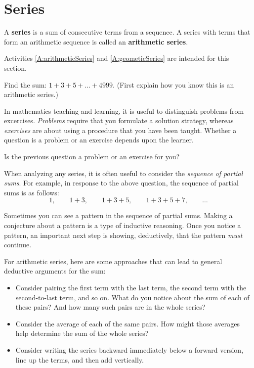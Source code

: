 \newpage

\section{Series}  
\begin{definition}
A \textbf{series} is a sum of consecutive terms from a sequence.  A series with terms that form an arithmetic sequence is called an \textbf{arithmetic series}.  
\end{definition}

\begin{activitynote}
Activities \ref{A:arithmeticSeries} and \ref{A:geometicSeries} are intended for this section.  
\end{activitynote}

\begin{question}
Find the sum:  $1 + 3 + 5 + \dots + 4999.$  (First explain how you know this is an arithmetic series.)
\end{question}
\QM

In mathematics teaching and learning, it is useful to distinguish problems from  excercises. \emph{Problems} require that you formulate a solution strategy, whereas \emph{exercises} are about using a procedure that you have been taught.  Whether a question is a problem or an exercise depends upon the learner.  
\begin{question}
Is the previous question a problem or an exercise for you?  
\end{question}

When analyzing any series, it is often useful to consider the \emph{sequence of partial sums}.  For example, in response to the above question, the sequence of partial sums is as follows:  $$1, \qquad 1 + 3, \qquad 1+ 3+5, \qquad 1+3+5+7, \qquad \dots$$

Sometimes you can see a pattern in the sequence of partial sums.  Making a conjecture about a pattern is a type of inductive reasoning.  Once you notice a pattern, an important next step is showing, deductively, that the pattern \emph{must} continue.  

For arithmetic series, here are some approaches that can lead to general deductive arguments for the sum: 

\begin{itemize}
\item Consider pairing the first term with the last term, the second term with the second-to-last term, and so on.  What do you notice about the sum of each of these pairs?  And how many such pairs are in the whole series?  
\item Consider the average of each of the same pairs.  How might those averages help determine the sum of the whole series?  
\item Consider writing the series backward immediately below a forward version, line up the terms, and then add vertically.  
\end{itemize}


